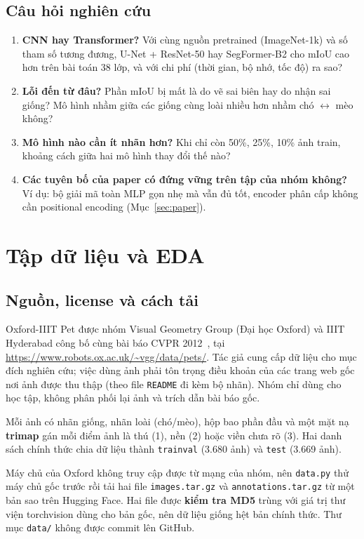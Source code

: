 \documentclass[12pt]{article}
\newcommand{\code}[1]{\texttt{#1}}
\newcommand{\st}[1]{\textbf{#1}}
\begin{document}
\subsection{Câu hỏi nghiên cứu}
\begin{enumerate}
  \item \st{CNN hay Transformer?} Với cùng nguồn pretrained (ImageNet-1k) và số tham số tương đương, U-Net + ResNet-50 hay
        SegFormer-B2 cho mIoU cao hơn trên bài toán 38 lớp, và với chi phí (thời gian, bộ nhớ, tốc độ) ra sao?
  \item \st{Lỗi đến từ đâu?} Phần mIoU bị mất là do vẽ sai biên hay do nhận sai giống? Mô hình nhầm giữa các giống cùng
        loài nhiều hơn nhầm chó $\leftrightarrow$ mèo không?
  \item \st{Mô hình nào cần ít nhãn hơn?} Khi chỉ còn 50\%, 25\%, 10\% ảnh train, khoảng cách giữa hai mô hình thay đổi thế nào?
  \item \st{Các tuyên bố của paper có đứng vững trên tập của nhóm không?} Ví dụ: bộ giải mã toàn MLP gọn nhẹ mà vẫn đủ tốt,
        encoder phân cấp không cần positional encoding (Mục~\ref{sec:paper}).
\end{enumerate}


\section{Tập dữ liệu và EDA}
\subsection{Nguồn, license và cách tải}
Oxford-IIIT Pet được nhóm Visual Geometry Group (Đại học Oxford) và IIIT Hyderabad công bố cùng bài báo CVPR
2012~\cite{parkhi2012}, tại \url{https://www.robots.ox.ac.uk/~vgg/data/pets/}. Tác giả cung cấp dữ liệu
cho mục đích nghiên cứu; việc dùng ảnh phải tôn trọng điều khoản của các trang web gốc nơi ảnh được thu thập (theo file
\code{README} đi kèm bộ nhãn). Nhóm chỉ dùng cho học tập, không phân phối lại ảnh và trích dẫn bài báo gốc.

Mỗi ảnh có nhãn giống, nhãn loài (chó/mèo), hộp bao phần đầu và một mặt nạ \st{trimap} gán mỗi điểm ảnh là thú (1), nền (2)
hoặc viền chưa rõ (3). Hai danh sách chính thức chia dữ liệu thành \code{trainval} (3.680 ảnh) và \code{test} (3.669 ảnh).

Máy chủ của Oxford không truy cập được từ mạng của nhóm, nên \code{data.py} thử máy chủ gốc trước rồi tải hai file
\code{images.tar.gz} và \code{annotations.tar.gz} từ một bản sao trên Hugging Face. Hai file được \st{kiểm tra MD5} trùng
với giá trị thư viện torchvision dùng cho bản gốc, nên dữ liệu giống hệt bản chính thức. Thư mục \code{data/} không được
commit lên GitHub.
\end{document}
